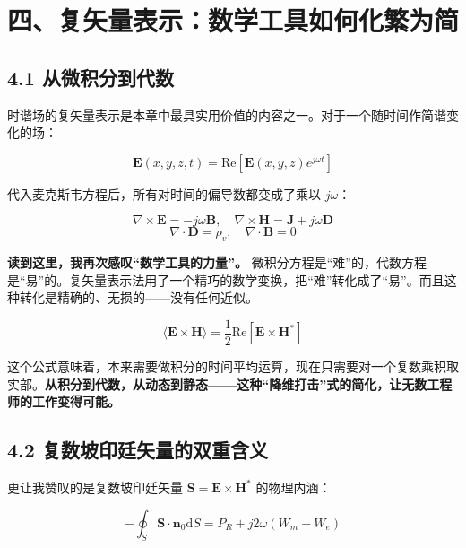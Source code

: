\documentclass[12pt,a4paper]{ctexart}
\begin{document}
\section*{四、复矢量表示：数学工具如何化繁为简}

\subsection*{4.1 从微积分到代数}

时谐场的复矢量表示是本章中最具实用价值的内容之一。对于一个随时间作简谐变化的场：

\begin{equation}
\mathbf{E}(x,y,z,t) = \mathrm{Re}[\mathbf{E}(x,y,z)e^{j\omega t}]
\end{equation}

代入麦克斯韦方程后，所有对时间的偏导数都变成了乘以 $j\omega$：

\begin{equation}
\nabla \times \mathbf{E} = -j\omega \mathbf{B}, \quad
\nabla \times \mathbf{H} = \mathbf{J} + j\omega \mathbf{D}
\end{equation}
\begin{equation}
\nabla \cdot \mathbf{D} = \rho_v, \quad
\nabla \cdot \mathbf{B} = 0
\end{equation}

\textbf{读到这里，我再次感叹“数学工具的力量”。} 微积分方程是“难”的，代数方程是“易”的。复矢量表示法用了一个精巧的数学变换，把“难”转化成了“易”。而且这种转化是精确的、无损的——没有任何近似。

\begin{equation}
\langle \mathbf{E} \times \mathbf{H} \rangle = \frac{1}{2}\mathrm{Re}[\mathbf{E} \times \mathbf{H}^*]
\end{equation}

这个公式意味着，本来需要做积分的时间平均运算，现在只需要对一个复数乘积取实部。\textbf{从积分到代数，从动态到静态——这种“降维打击”式的简化，让无数工程师的工作变得可能。}

\subsection*{4.2 复数坡印廷矢量的双重含义}

更让我赞叹的是复数坡印廷矢量 $\mathbf{S} = \mathbf{E} \times \mathbf{H}^*$ 的物理内涵：

\begin{equation}
-\oint_S \mathbf{S} \cdot \mathbf{n}_0 \mathrm{d}S = P_R + j2\omega(W_m - W_e)
\end{equation}
\end{document}

